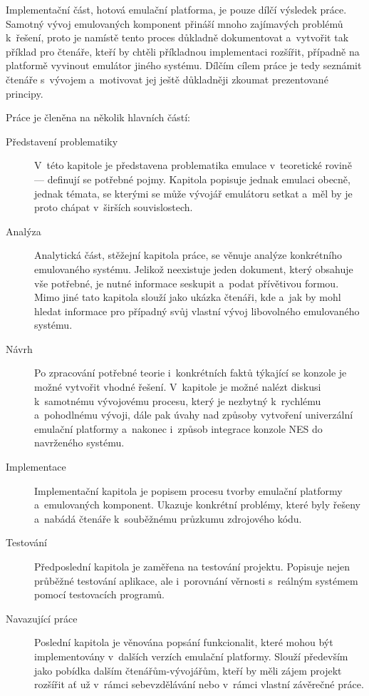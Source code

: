 Implementační část, hotová emulační platforma, je pouze dílčí výsledek práce. Samotný vývoj emulovaných komponent přináší mnoho zajímavých problémů k~řešení, proto je namístě tento proces důkladně dokumentovat a~vytvořit tak příklad pro čtenáře, kteří by chtěli příkladnou implementaci rozšířit, případně na platformě vyvinout emulátor jiného systému. Dílčím cílem práce je tedy seznámit čtenáře s~vývojem a~motivovat jej  ještě důkladněji zkoumat prezentované principy.

Práce je členěna na několik hlavních částí:
\begin{description}
	\item[Představení problematiky] V~této kapitole je představena problematika emulace v~teoretické rovině --- definují se potřebné pojmy. Kapitola popisuje jednak emulaci obecně, jednak témata, se kterými se může vývojář emulátoru setkat a~měl by je proto chápat v~širších souvislostech.
	\item[Analýza] Analytická část, stěžejní kapitola práce, se věnuje analýze konkrétního emulovaného systému. Jelikož neexistuje jeden dokument, který obsahuje vše potřebné, je nutné informace seskupit a~podat přívětivou formou. Mimo jiné tato kapitola slouží jako ukázka čtenáři, kde a~jak by mohl hledat informace pro případný svůj vlastní vývoj libovolného emulovaného systému.
	\item[Návrh] Po zpracování potřebné teorie i~konkrétních faktů týkající se konzole je možné vytvořit vhodné řešení. V~kapitole je možné nalézt diskusi k~samotnému vývojovému procesu, který je nezbytný k~rychlému a~pohodlnému vývoji, dále pak úvahy nad způsoby vytvoření univerzální emulační platformy a~nakonec i~způsob integrace konzole NES do navrženého systému.
	\item[Implementace] Implementační kapitola je popisem procesu tvorby emulační platformy a~emulovaných komponent. Ukazuje konkrétní problémy, které byly řešeny a~nabádá čtenáře k~souběžnému průzkumu zdrojového kódu.
	\item[Testování] Předposlední kapitola je zaměřena na testování projektu. Popisuje nejen průběžné testování aplikace, ale i~porovnání věrnosti s~reálným systémem pomocí testovacích programů.
	\item[Navazující práce] Poslední kapitola je věnována popsání funkcionalit, které mohou být implementovány v~dalších verzích emulační platformy. Slouží především jako pobídka dalším čtenářům-vývojářům, kteří by měli zájem projekt rozšířit ať už v~rámci sebevzdělávání nebo v~rámci vlastní závěrečné práce.
\end{description}

